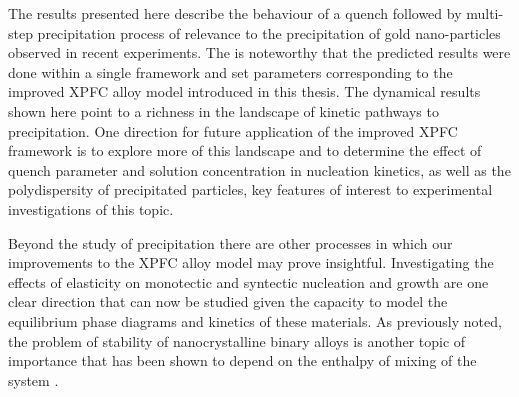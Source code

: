 
The results presented here describe the behaviour of a quench followed by
multi-step precipitation process of relevance to the precipitation of gold
nano-particles observed in recent experiments. The is noteworthy that the
predicted results were done within a single framework and set parameters
corresponding to the improved XPFC alloy model introduced in this thesis. The
dynamical results shown here point to a richness in the landscape of kinetic
pathways to precipitation. One direction for future application of the improved
XPFC framework is to explore more of this landscape and to determine the effect
of quench parameter and solution concentration in nucleation kinetics, as well
as the polydispersity of precipitated particles, key features of interest to
experimental investigations of this topic.


Beyond the study of precipitation there are other processes in which our
improvements to the XPFC alloy model may prove insightful. Investigating the
effects of elasticity on monotectic and  syntectic nucleation and growth are
one clear direction that can now be studied given the capacity to model the
equilibrium phase diagrams and kinetics of these materials. As previously
noted, the problem of stability of nanocrystalline binary alloys is another
topic of importance that has  been shown to depend on the enthalpy of mixing of
the system \cite{MURDOCH13}.

